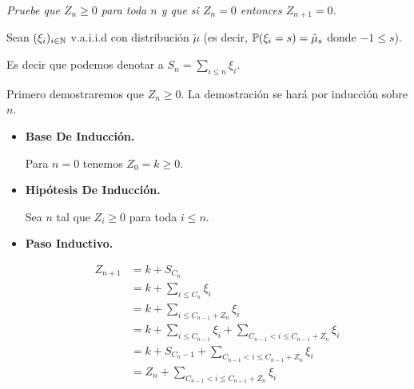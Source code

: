 \emph{
    Pruebe que $Z_n\geq 0$ para toda $n$ y que si $Z_n=0$ entonces $Z_{n+1}=0$.
}

\afterstatement\par\null

Sean $(\xi_i)_{i \in \mathbb{N}}$ v.a.i.i.d con distribución $\tilde\mu$ 
(es decir, $\mathbb{P}(\xi_i = s) = \tilde\mu_s$ donde $-1 \leq s$).\par\null

Es decir que podemos denotar a $S_n = \sum_{i \leq n} \xi_i$.\par\null

Primero demostraremos que $Z_n \geq 0$. La demostración se hará por inducción sobre $n$.

\begin{itemize}
	\item 
        \textbf{Base De Inducción.}
        
        Para $n = 0$ tenemos $Z_0 = k \geq 0$.\par\null
        
    \item
        \textbf{Hipótesis De Inducción.}
        
        Sea $n$ tal que $Z_i \geq 0$ para toda $i \leq n$.\par\null
        
    \item
        \textbf{Paso Inductivo.}
        
        \begin{align} \label{problema4_2:descomposicion_de_Z_n+1}
            Z_{n+1}     &=  k + S_{C_n}                                                                             \\
                        &=  k + \sum_{i \leq C_n} \xi_i                                                             \\
                        &=  k + \sum_{i \leq C_{n-1} + Z_{n}} \xi_i                                                 \\
                        &=  k + \sum_{i \leq C_{n-1}} \xi_i + \sum_{C_{n-1} < i \leq  C_{n-1} + Z_{n}} \xi_i        \\
                        &=  k + S_{C_n-1} + \sum_{C_{n-1} < i \leq  C_{n-1} +Z_{n}} \xi_i                           \\
                        &=  Z_n + \sum_{C_{n-1} < i \leq  C_{n-1} + Z_{n}} \xi_i                                    \\                        
        \end{align}
        

\end{itemize}
